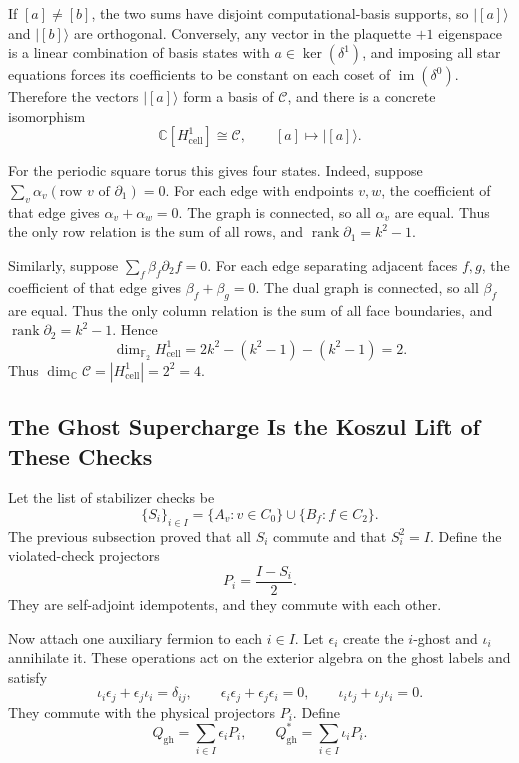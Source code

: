 If \([a]\neq[b]\), the two sums have disjoint computational-basis supports, so
\(|[a]\rangle\) and \(|[b]\rangle\) are orthogonal. Conversely, any vector in
the plaquette \(+1\) eigenspace is a linear combination of basis states with
\(a\in\ker(\delta^1)\), and imposing all star equations forces its coefficients
to be constant on each coset of \(\operatorname{im}(\delta^0)\). Therefore the
vectors \(|[a]\rangle\) form a basis of \(\mathcal C\), and there is a concrete
isomorphism
\[
  \mathbb C[H^1_{\mathrm{cell}}]\cong \mathcal C,\qquad
  [a]\mapsto |[a]\rangle .
\]

For the periodic square torus this gives four states. Indeed, suppose
\(\sum_v \alpha_v(\text{row }v\text{ of }\partial_1)=0\). For each edge with
endpoints \(v,w\), the coefficient of that edge gives
\(\alpha_v+\alpha_w=0\). The graph is connected, so all \(\alpha_v\) are equal.
Thus the only row relation is the sum of all rows, and
\(\operatorname{rank}\partial_1=k^2-1\).

Similarly, suppose \(\sum_f\beta_f\partial_2 f=0\). For each edge separating
adjacent faces \(f,g\), the coefficient of that edge gives
\(\beta_f+\beta_g=0\). The dual graph is connected, so all \(\beta_f\) are
equal. Thus the only column relation is the sum of all face boundaries, and
\(\operatorname{rank}\partial_2=k^2-1\). Hence
\[
  \dim_{\mathbb F_2}H^1_{\mathrm{cell}}
  =2k^2-(k^2-1)-(k^2-1)=2.
\]
Thus \(\dim_{\mathbb C}\mathcal C=|H^1_{\mathrm{cell}}|=2^2=4\).

\subsection{The Ghost Supercharge Is the Koszul Lift of These Checks}

Let the list of stabilizer checks be
\[
  \{S_i\}_{i\in I}=\{A_v:v\in C_0\}\cup\{B_f:f\in C_2\}.
\]
The previous subsection proved that all \(S_i\) commute and that \(S_i^2=I\).
Define the violated-check projectors
\[
  P_i=\frac{I-S_i}{2}.
\]
They are self-adjoint idempotents, and they commute with each other.

Now attach one auxiliary fermion to each \(i\in I\). Let \(\epsilon_i\) create
the \(i\)-ghost and \(\iota_i\) annihilate it. These operations act on the
exterior algebra on the ghost labels and satisfy
\[
  \iota_i\epsilon_j+\epsilon_j\iota_i=\delta_{ij},\qquad
  \epsilon_i\epsilon_j+\epsilon_j\epsilon_i=0,\qquad
  \iota_i\iota_j+\iota_j\iota_i=0 .
\]
They commute with the physical projectors \(P_i\). Define
\[
  Q_{\mathrm{gh}}=\sum_{i\in I}\epsilon_iP_i,\qquad
  Q_{\mathrm{gh}}^*=\sum_{i\in I}\iota_iP_i .
\]

